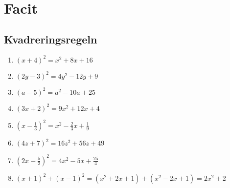 \documentclass[a4paper,11pt]{article}
\begin{document}
\newpage
\section*{Facit}

\subsection*{Kvadreringsregeln}
\begin{enumerate}[label=\textbf{\arabic*.}]
    \item $(x+4)^2 = x^2 + 8x + 16$
    \item $(2y-3)^2 = 4y^2 - 12y + 9$
    \item $(a-5)^2 = a^2 - 10a + 25$
    \item $(3x+2)^2 = 9x^2 + 12x + 4$
    \item $(x-\frac{1}{3})^2 = x^2 - \frac{2}{3}x + \frac{1}{9}$
    \item $(4z+7)^2 = 16z^2 + 56z + 49$
    \item $(2x-\frac{5}{2})^2 = 4x^2 - 5x + \frac{25}{4}$
    \item $(x+1)^2 + (x-1)^2 = (x^2 + 2x + 1) + (x^2 - 2x + 1) = 2x^2 + 2$
\end{enumerate}
\end{document}
